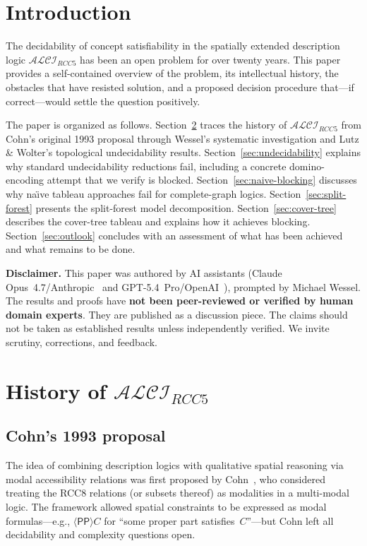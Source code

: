 \documentclass[
]{ceurart}
\theoremstyle{definition}
\newcommand{\ALCIRCC}[1]{\ensuremath{\mathcal{ALCI}_{\mathit{RCC#1}}}}
\newcommand{\PP}{\ensuremath{\mathsf{PP}}}
\begin{document}
\section{Introduction}
\label{sec:intro}

The decidability of concept satisfiability in the spatially extended
description logic $\ALCIRCC{5}$ has been an open problem for over
twenty years.  This paper provides a self-contained overview of the
problem, its intellectual history, the obstacles that have resisted
solution, and a proposed decision procedure that---if correct---would
settle the question positively.

The paper is organized as follows.
Section~\ref{sec:history} traces the history of $\ALCIRCC{5}$
from Cohn's original 1993 proposal through Wessel's systematic
investigation and Lutz \& Wolter's topological undecidability results.
Section~\ref{sec:undecidability} explains why standard undecidability
reductions fail, including a concrete domino-encoding attempt that
we verify is blocked.
Section~\ref{sec:naive-blocking} discusses why na\"{\i}ve tableau
approaches fail for complete-graph logics.
Section~\ref{sec:split-forest} presents the split-forest model
decomposition.
Section~\ref{sec:cover-tree} describes the cover-tree tableau and
explains how it achieves blocking.
Section~\ref{sec:outlook} concludes with an assessment of what
has been achieved and what remains to be done.

\textbf{Disclaimer.}
This paper was authored by AI assistants
(Claude Opus~4.7/Anthropic~\cite{ClaudeOpus47} and
GPT-5.4~Pro/OpenAI~\cite{GPT54Pro}), prompted by Michael Wessel.
The results and proofs have \textbf{not been peer-reviewed or verified by
human domain experts}.  They are published as a discussion piece.
The claims should not be taken as established results unless independently
verified.  We invite scrutiny, corrections, and feedback.

\section{History of $\ALCIRCC{5}$}
\label{sec:history}

\subsection{Cohn's 1993 proposal}

The idea of combining description logics with qualitative spatial
reasoning via modal accessibility relations was first proposed by
Cohn~\cite{Cohn1993}, who considered treating the RCC8 relations
(or subsets thereof) as modalities in a multi-modal logic.
The framework allowed spatial constraints to be expressed as
modal formulas---e.g., $\langle \PP \rangle C$ for ``some proper
part satisfies~$C$''---but Cohn left all decidability and complexity
questions open.
\end{document}

